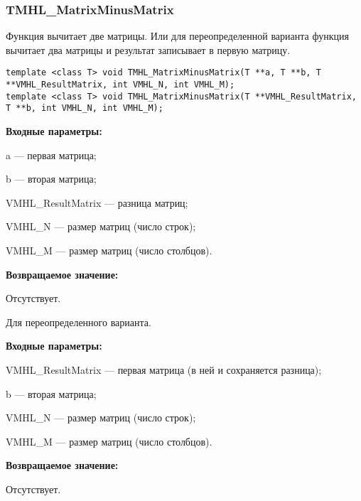 \documentclass[a4paper,12pt]{article}
\begin{document}
\subsubsection{TMHL\_MatrixMinusMatrix}\label{TMHL_MatrixMinusMatrix}

Функция вычитает две матрицы. Или для переопределенной варианта функция вычитает два матрицы и результат записывает в первую матрицу. 


\begin{lstlisting}[label=code_syntax_TMHL_MatrixMinusMatrix,caption=Синтаксис]
template <class T> void TMHL_MatrixMinusMatrix(T **a, T **b, T **VMHL_ResultMatrix, int VMHL_N, int VMHL_M);
template <class T> void TMHL_MatrixMinusMatrix(T **VMHL_ResultMatrix, T **b, int VMHL_N, int VMHL_M);
\end{lstlisting}

\textbf{Входные параметры:}

 a --- первая матрица;
 
 b --- вторая матрица;
 
 VMHL\_ResultMatrix --- разница матриц;
 
 VMHL\_N --- размер матриц (число строк);
 
 VMHL\_M --- размер матриц (число столбцов).

\textbf{Возвращаемое значение:}

Отсутствует.

Для переопределенного варианта.

\textbf{Входные параметры:}

 VMHL\_ResultMatrix --- первая матрица (в ней и сохраняется разница);
 
 b --- вторая матрица;
 
 VMHL\_N --- размер матриц (число строк);
 
 VMHL\_M --- размер матриц (число столбцов).
 
 \textbf{Возвращаемое значение:}

Отсутствует.
\end{document}
